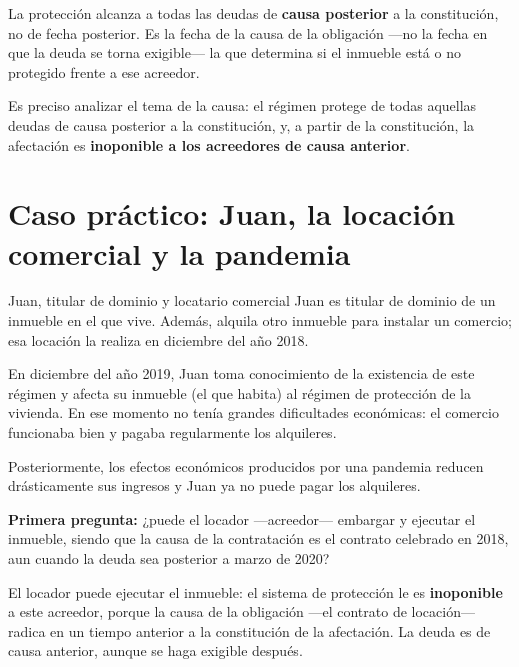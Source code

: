 \documentclass[12pt,oneside]{book}
\begin{document}
\begin{important}
La protecci\'on alcanza a todas las deudas de \textbf{causa posterior} a la constituci\'on, no de fecha posterior. Es la fecha de la causa de la obligaci\'on ---no la fecha en que la deuda se torna exigible--- la que determina si el inmueble est\'a o no protegido frente a ese acreedor.
\end{important}

Es preciso analizar el tema de la causa: el r\'egimen protege de todas aquellas deudas de causa posterior a la constituci\'on, y, a partir de la constituci\'on, la afectaci\'on es \textbf{inoponible a los acreedores de causa anterior}.

\section{Caso pr\'actico: Juan, la locaci\'on comercial y la pandemia}

\begin{example}{Juan, titular de dominio y locatario comercial}
Juan es titular de dominio de un inmueble en el que vive. Adem\'as, alquila otro inmueble para instalar un comercio; esa locaci\'on la realiza en diciembre del a\~no 2018.

En diciembre del a\~no 2019, Juan toma conocimiento de la existencia de este r\'egimen y afecta su inmueble (el que habita) al r\'egimen de protecci\'on de la vivienda. En ese momento no ten\'ia grandes dificultades econ\'omicas: el comercio funcionaba bien y pagaba regularmente los alquileres.

Posteriormente, los efectos econ\'omicos producidos por una pandemia reducen dr\'asticamente sus ingresos y Juan ya no puede pagar los alquileres.
\end{example}

\textbf{Primera pregunta:} ¿puede el locador ---acreedor--- embargar y ejecutar el inmueble, siendo que la causa de la contrataci\'on es el contrato celebrado en 2018, aun cuando la deuda sea posterior a marzo de 2020?

\begin{important}
El locador puede ejecutar el inmueble: el sistema de protecci\'on le es \textbf{inoponible} a este acreedor, porque la causa de la obligaci\'on ---el contrato de locaci\'on--- radica en un tiempo anterior a la constituci\'on de la afectaci\'on. La deuda es de causa anterior, aunque se haga exigible despu\'es.
\end{important}
\end{document}
